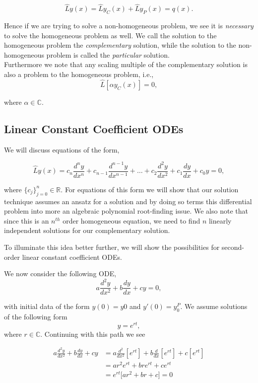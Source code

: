 $$\hat{L} y(x) = \hat{L} y_C(x) + \hat{L} y_P(x)  = q(x).$$

Hence if we are trying to solve a non-homogeneous problem, we see it is \emph{necessary} to solve the homogeneous problem as well. We call the solution to the homogeneous problem the \emph{complementary} solution, while the solution to the non-homogeneous problem is called the \emph{particular} solution. \\

Furthermore we note that any scaling multiple of the complementary solution is also a problem to the homogeneous problem, i.e., $$\hat{L}[ \alpha y_C(x) ] = 0,$$

where $\alpha\in\mathbb{C}.$




%
%

\subsection{Linear Constant Coefficient ODEs}

We will discuss equations of the form, 

$$\hat{L}y(x) =  c_n \frac{d^n y}{dx^n} + c_{n-1} \frac{d^{n-1} y}{dx^{n-1}} + \ldots + c_2 \frac{d^2 y}{dx^2} + c_1 \frac{dy}{dx} + c_0y = 0,$$

where $\{ c_j \}_{j=0}^{n} \in \mathbb{R}.$ For equations of this form we will show that our solution technique assumes an ansatz for a solution and by doing so terms this differential problem into more an algebraic polynomial root-finding issue. We also note that since this is an $n^{th}$ order homogeneous equation, we need to find $n$ linearly independent solutions for our complementary solution.

To illuminate this idea better further, we will show the possibilities for second-order linear constant coefficient ODEs. 

We now consider the following ODE,
\begin{equation}
\label{2nd_order_cc_ode} a \frac{d^2 y}{dx^2} + b \frac{dy}{dx} + c y = 0,
\end{equation}

with initial data of the form $y(0) = y0$ and $y'(0) = y_0^P.$ We assume solutions of the following form $$y = e^{rt},$$ where $r\in\mathbb{C}$. Continuing with this path we see

\begin{align*}
a \frac{d^2 y}{dx^2} + b \frac{dy}{dx} + c y &= a \frac{d^2}{dx^2}\left[e^{rt}\right] + b \frac{d}{dx}\left[e^{rt}\right] + c \left[e^{rt}\right]\\
& = a r^2 e^{rt} + b r e^{rt} + c e^{rt} \\
& = e^{rt} \Big[ a r^2 + b r + c \Big] = 0
\end{align*}

